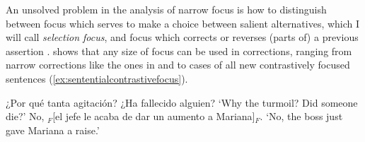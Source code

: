 %
%
%
%
An unsolved problem in the analysis of narrow focus is how to distinguish between focus which serves to make a choice between salient alternatives, which I will call \textit{selection focus}, and focus which corrects or reverses (parts of) a previous assertion \citep[10]{Lee.2017}. \citet[27, 32, 34--35]{Buring.2016} shows that any size of focus can be used in corrections, ranging from narrow corrections like the ones in  and  to cases of all new contrastively focused sentences (\ref{ex:sententialcontrastivefocus}).

\begin{exe}
	\ex \label{ex:sententialcontrastivefocus}
	\begin{xlist}
	 ¿Por qué tanta agitación? ¿Ha fallecido alguien?
	\glt `Why the turmoil? Did someone die?'
	 No, $_F$[el jefe le acaba de dar un aumento a Mariana]$_F$.
	\glt `No, the boss just gave Mariana a raise.'
	\end{xlist}
\end{exe}

